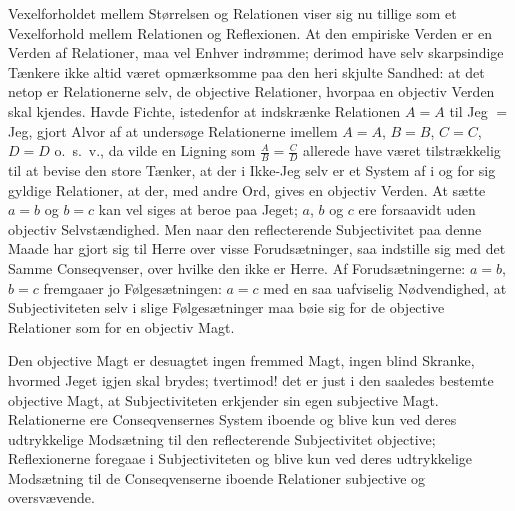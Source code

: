 \documentclass[12pt]{book}
\newcommand{\opage}[1]{\marginnote{\footnotesize\textit{[#1]}}}
\begin{document}
Vexelforholdet mellem Størrelsen og Relationen viser sig nu tillige som et
Vexelforhold mellem Relationen og Reflexionen. At den empiriske Verden er en Verden
af Relationer, maa vel Enhver indrømme; derimod have selv skarpsindige Tænkere ikke
altid været opmærksomme paa den heri skjulte Sandhed: at det netop er Relationerne
selv, de objective Relationer, hvorpaa en objectiv Verden skal kjendes. Havde Fichte,
istedenfor at indskrænke Relationen $A = A$ til Jeg $=$ Jeg, gjort Alvor af at
undersøge Relationerne imellem $A = A$, $B = B$, $C = C$, $D = D$ o.\ s.\ v., da
vilde en Ligning som $\frac{A}{B} = \frac{C}{D}$ allerede have været tilstrækkelig til
at bevise den store Tænker, at der i Ikke-Jeg selv er et System af i og for sig
gyldige Relationer, at der, med andre Ord, gives en objectiv Verden. At sætte $a = b$
og $b = c$ kan vel siges at beroe paa Jeget; $a$, $b$ og $c$ ere forsaavidt uden
objectiv Selvstændighed. Men naar den reflecterende Subjectivitet paa denne Maade
har gjort sig til Herre over visse Forudsætninger, saa indstille sig med det Samme
Conseqvenser, over hvilke den ikke er Herre. Af Forudsætningerne: $a = b$, $b = c$
fremgaaer jo Følgesætningen: $a = c$ med en saa
\opage{75} uafviselig Nødvendighed, at Subjectiviteten selv i slige Følgesætninger maa bøie sig
for de objective Relationer som for en objectiv Magt.

Den objective Magt er desuagtet ingen fremmed Magt, ingen blind Skranke, hvormed
Jeget igjen skal brydes; tvertimod! det er just i den saaledes bestemte objective
Magt, at Subjectiviteten erkjender sin egen subjective Magt. Relationerne ere
Conseqvensernes System iboende og blive kun ved deres udtrykkelige Modsætning til den
reflecterende Subjectivitet objective; Reflexionerne foregaae i Subjectiviteten og
blive kun ved deres udtrykkelige Modsætning til de Conseqvenserne iboende Relationer
subjective og oversvævende.
\end{document}
